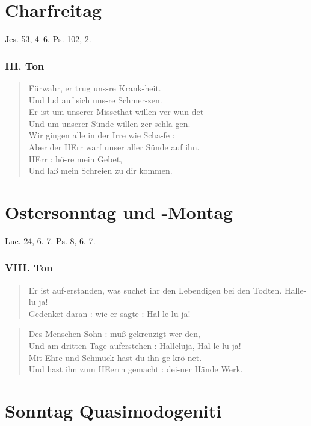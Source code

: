 \section{Charfreitag}

Jes. 53, 4–6. Ps. 102, 2.

\subsubsection{III. Ton}
\begin{verse}
Fürwahr, er trug uns-re Krank-heit.\\
Und lud auf sich uns-re Schmer-zen.\\
Er ist um unserer Missethat willen ver-wun-det\\
Und um unserer Sünde willen zer-schla-gen.\\
Wir gingen alle in der Irre wie Scha-fe :\\
Aber der HErr warf unser aller Sünde auf ihn.\\
HErr : hö-re mein Gebet,\\
Und laß mein Schreien zu dir kommen.
\end{verse}

\section{Ostersonntag und -Montag}

Luc. 24, 6. 7. Ps. 8, 6. 7.

\subsubsection{VIII. Ton}
\begin{verse}
Er ist auf-erstanden, was suchet ihr den Lebendigen bei den Todten. Halle-lu-ja!\\
Gedenket daran : wie er sagte : Hal-le-lu-ja!
\end{verse}

\begin{verse}
Des Menschen Sohn : muß gekreuzigt wer-den,\\
Und am dritten Tage auferstehen : Halleluja, Hal-le-lu-ja!\\
Mit Ehre und Schmuck hast du ihn ge-krö-net.\\
Und hast ihn zum HEerrn gemacht : dei-ner Hände Werk.
\end{verse}

\section{Sonntag Quasimodogeniti}

